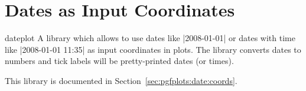 
\section[libs.dateplot]{Dates as Input Coordinates}

\begin{pgfplotslibrary}{dateplot}
    A library which allows to use dates like |2008-01-01| or dates with time
    like |2008-01-01 11:35| as input coordinates in plots. The library converts
    dates to numbers and tick labels will be pretty-printed dates (or times).

    This library is documented in Section~\ref{sec:pgfplots:date:coords}.
\end{pgfplotslibrary}
